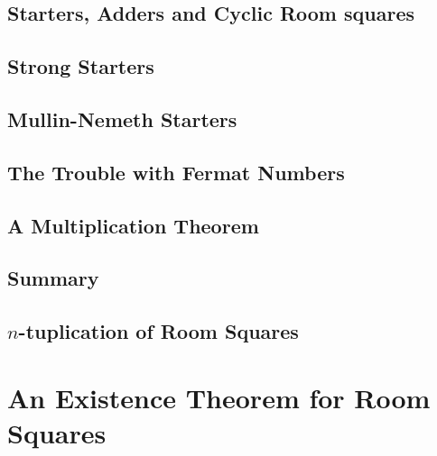 \documentclass[a4paper, draft]{book}
\begin{document}
\section{Starters, Adders and Cyclic Room squares}
  
\section{Strong Starters}
  \label{sec:strong-starters}
  
\section{Mullin-Nemeth Starters}
  \label{sec:mullin-nemeth}
  
\section{The Trouble with Fermat Numbers}
  \label{sec:trouble-fermat}
  
\section{A Multiplication Theorem}
  
\section{Summary}
  
\section{$n$-tuplication of Room Squares}
  

\chapter{An Existence Theorem for Room Squares}
  \label{ch:existence-theorem}
  




\backmatter
\printbibliography[title=References]
\end{document}
